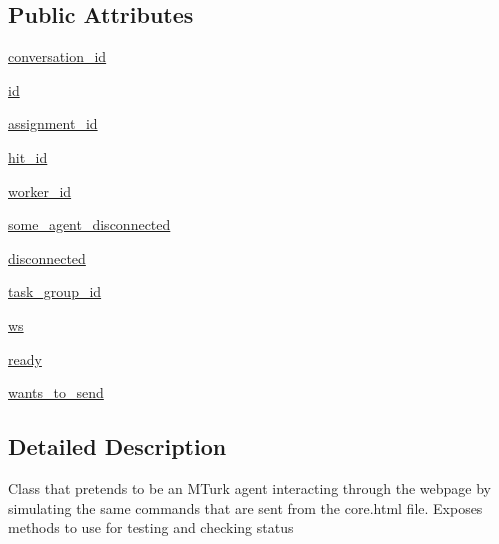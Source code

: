 \subsection*{Public Attributes}
\begin{DoxyCompactItemize}
\item 
\hyperlink{classparlai_1_1mturk_1_1core_1_1dev_1_1test_1_1test__socket__manager_1_1MockAgent_a21ba5d90cf3547f6189e7d2177af8121}{conversation\+\_\+id}
\item 
\hyperlink{classparlai_1_1mturk_1_1core_1_1dev_1_1test_1_1test__socket__manager_1_1MockAgent_a0b8b022e8140e9251659ccabe9fcb33d}{id}
\item 
\hyperlink{classparlai_1_1mturk_1_1core_1_1dev_1_1test_1_1test__socket__manager_1_1MockAgent_af44235241bced0c401cd8fef3252a0a4}{assignment\+\_\+id}
\item 
\hyperlink{classparlai_1_1mturk_1_1core_1_1dev_1_1test_1_1test__socket__manager_1_1MockAgent_a0aedeb9d62656383763abbf154857c37}{hit\+\_\+id}
\item 
\hyperlink{classparlai_1_1mturk_1_1core_1_1dev_1_1test_1_1test__socket__manager_1_1MockAgent_adabb3feeb1730f04d80f84c855d86200}{worker\+\_\+id}
\item 
\hyperlink{classparlai_1_1mturk_1_1core_1_1dev_1_1test_1_1test__socket__manager_1_1MockAgent_a86f4ed77012aca5d7600238f1b370047}{some\+\_\+agent\+\_\+disconnected}
\item 
\hyperlink{classparlai_1_1mturk_1_1core_1_1dev_1_1test_1_1test__socket__manager_1_1MockAgent_a52c8b93cf5a7e16b75da176dd0caba8a}{disconnected}
\item 
\hyperlink{classparlai_1_1mturk_1_1core_1_1dev_1_1test_1_1test__socket__manager_1_1MockAgent_abbdca65743dccef13d2168f4904f1bf8}{task\+\_\+group\+\_\+id}
\item 
\hyperlink{classparlai_1_1mturk_1_1core_1_1dev_1_1test_1_1test__socket__manager_1_1MockAgent_a4b3ec6c638cfe8095425ddab95a69cac}{ws}
\item 
\hyperlink{classparlai_1_1mturk_1_1core_1_1dev_1_1test_1_1test__socket__manager_1_1MockAgent_af77ac0423935da0060e9d632c82e03aa}{ready}
\item 
\hyperlink{classparlai_1_1mturk_1_1core_1_1dev_1_1test_1_1test__socket__manager_1_1MockAgent_a9b5d912718218efb899c9de68e82b4d2}{wants\+\_\+to\+\_\+send}
\end{DoxyCompactItemize}


\subsection{Detailed Description}
\begin{DoxyVerb}Class that pretends to be an MTurk agent interacting through the
webpage by simulating the same commands that are sent from the core.html
file. Exposes methods to use for testing and checking status
\end{DoxyVerb}
 

